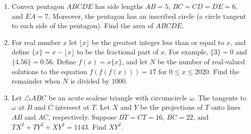 \documentclass{article}%
\begin{document}
\begin{enumerate}
%
\item%
[\textbf{Problem 13}]Convex pentagon $ABCDE$ has side lengths $AB=5$, $BC=CD=DE=6$, and $EA=7$. Moreover, the pentagon has an inscribed circle (a circle tangent to each side of the pentagon). Find the area of $ABCDE$.
%
\item%
[\textbf{Problem 14}]For real number $x$ let $\lfloor x\rfloor$ be the greatest integer less than or equal to $x$, and define $\{x\} = x - \lfloor x \rfloor$ to be the fractional part of $x$. For example, $\{3\} = 0$ and $\{4.56\} = 0.56$. Define $f(x)=x\{x\}$, and let $N$ be the number of real-valued solutions to the equation $f(f(f(x)))=17$ for $0\leq x\leq 2020$. Find the remainder when $N$ is divided by $1000$.
%
\item%
[\textbf{Problem 15}]Let $\triangle ABC$ be an acute scalene triangle with circumcircle $\omega$. The tangents to $\omega$ at $B$ and $C$ intersect at $T$. Let $X$ and $Y$ be the projections of $T$ onto lines $AB$ and $AC$, respectively. Suppose $BT = CT = 16$, $BC = 22$, and $TX^2 + TY^2 + XY^2 = 1143$. Find $XY^2$.
%
\end{enumerate}

%
\end{document}
